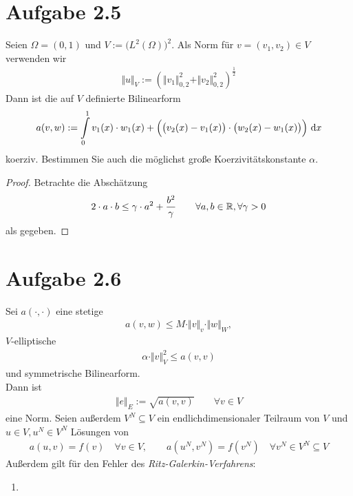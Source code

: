 \documentclass[12pt,a4paper]{article}
\begin{document}
\section*{Aufgabe 2.5}
Seien $\Omega=(0,1)$ und $V:=\big(L^2(\Omega)\big)^2$. Als Norm für $v=(v_1,v_2)\in V$ verwenden wir
\begin{align*}
\Vert u\Vert_V:=\left(\Vert v_1\Vert_{0,2}^2+\Vert v_2\Vert^2_{0,2}\right)^{\frac{1}{2}}
\end{align*}
Dann ist die auf $V$ definierte Bilinearform
\begin{align*}
a(v,w):=\int\limits_0^1 v_1(x)\cdot w_1(x)+\Big(\big(v_2(x)-v_1(x)\big)\cdot\big(w_2(x)-w_1(x)\big)\Big)\text{ d} x
\end{align*}
koerziv. Bestimmen Sie auch die möglichst große Koerzivitätskonstante $\alpha$.

\begin{proof}
Betrachte die Abschätzung
\begin{align}\label{Hinweis2.5}
2\cdot a\cdot b\leq\gamma\cdot a^2+\frac{b^2}{\gamma}\qquad\forall a,b\in\mathbb{R},\forall\gamma>0
\end{align}
als gegeben.


\end{proof}

\section*{Aufgabe 2.6}
Sei $a(\cdot,\cdot)$ eine stetige
\begin{align*}
a(v,w)\leq M\cdot\Vert v\Vert_v\cdot\Vert w\Vert_W,
\end{align*}
$V$-elliptische
\begin{align*}
\alpha\cdot\Vert v\Vert^2_V\leq a(v,v)
\end{align*}
und symmetrische Bilinearform.\\
Dann ist
\begin{align*}
\Vert e\Vert_E:=\sqrt{a(v,v)}\qquad\forall v\in V
\end{align*}
eine Norm. Seien außerdem $V^N\subseteq V$ ein endlichdimensionaler Teilraum von $V$ und $u\in V,u^N\in V^N$ Lösungen von
\begin{align*}
a(u,v)=f(v)\quad\forall v\in V,\qquad a(u^N,v^N)=f(v^N)\quad\forall v^N\in V^N\subseteq V
\end{align*}
Außerdem gilt für den Fehler des \textit{Ritz-Galerkin-Verfahrens}:
\begin{enumerate}[label=(\alph*)]
\item
\end{enumerate}
\end{document}
